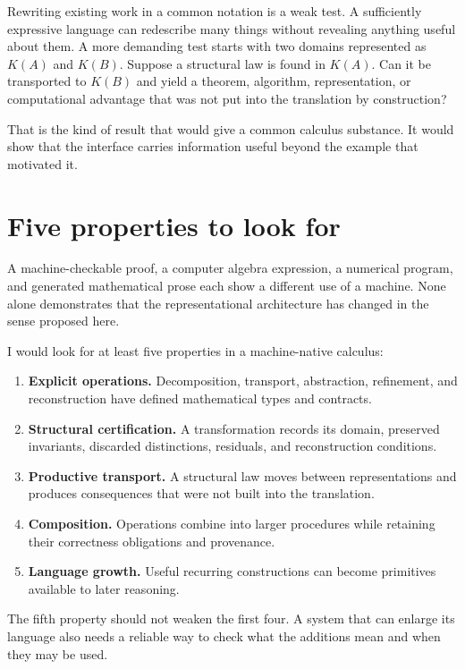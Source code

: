 \documentclass[11pt,oneside,openany]{book}
\begin{document}
Rewriting existing work in a common notation is a weak test. A sufficiently expressive language can redescribe many things without revealing anything useful about them. A more demanding test starts with two domains represented as \(K(A)\) and \(K(B)\). Suppose a structural law is found in \(K(A)\). Can it be transported to \(K(B)\) and yield a theorem, algorithm, representation, or computational advantage that was not put into the translation by construction?

That is the kind of result that would give a common calculus substance. It would show that the interface carries information useful beyond the example that motivated it.

\section{Five properties to look for}
A machine-checkable proof, a computer algebra expression, a numerical program, and generated mathematical prose each show a different use of a machine. None alone demonstrates that the representational architecture has changed in the sense proposed here.

I would look for at least five properties in a machine-native calculus:

\begin{enumerate}
\item \textbf{Explicit operations.} Decomposition, transport, abstraction, refinement, and reconstruction have defined mathematical types and contracts.
\item \textbf{Structural certification.} A transformation records its domain, preserved invariants, discarded distinctions, residuals, and reconstruction conditions.
\item \textbf{Productive transport.} A structural law moves between representations and produces consequences that were not built into the translation.
\item \textbf{Composition.} Operations combine into larger procedures while retaining their correctness obligations and provenance.
\item \textbf{Language growth.} Useful recurring constructions can become primitives available to later reasoning.
\end{enumerate}

The fifth property should not weaken the first four. A system that can enlarge its language also needs a reliable way to check what the additions mean and when they may be used.
\end{document}
